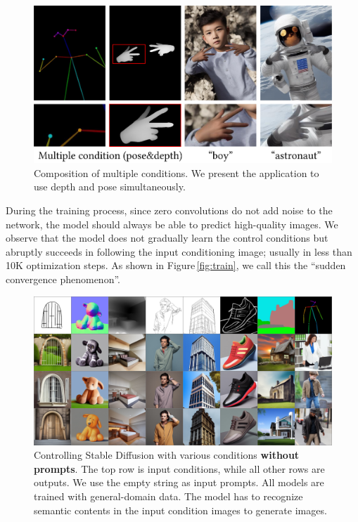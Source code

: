 \documentclass[10pt,twocolumn,letterpaper]{article}
\begin{document}
	\begin{figure}[!t]
		\includegraphics[width=\linewidth]{./imgs/multi.pdf}
		\vspace{-22pt}
		\caption{Composition of multiple conditions. We present the application to use depth and pose simultaneously.}
		\label{fig:multi}
		\vspace{-10pt}
	\end{figure}
	
	During the training process, since zero convolutions do not add noise to the network, the model should always be able to predict high-quality images. We observe that the model does not gradually learn the control conditions but abruptly succeeds in following the input conditioning image; usually in less than 10K optimization steps. As shown in Figure\,\ref{fig:train}, we call this the ``sudden convergence phenomenon''.
	
	\begin{figure}
		\centering
		\includegraphics[width=\linewidth]{./imgs/qua.jpg}
		\vspace{-17pt}
		\caption{Controlling Stable Diffusion with various conditions \textbf{without prompts}. The top row is input conditions, while all other rows are outputs. We use the empty string as input prompts. All models are trained with general-domain data. The model has to recognize semantic contents in the input condition images to generate images.}
		\vspace{-7pt}
		\label{fig:qua}
	\end{figure}
	
\end{document}
